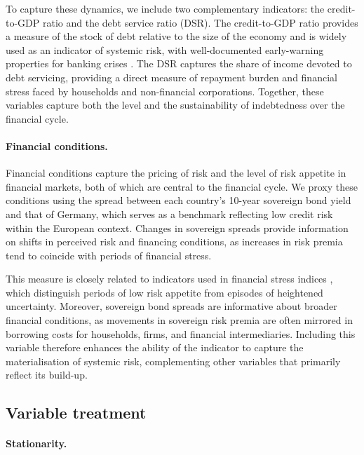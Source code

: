 To capture these dynamics, we include two complementary indicators: the credit-to-GDP ratio and the debt service ratio (DSR). The credit-to-GDP ratio provides a measure of the stock of debt relative to the size of the economy and is widely used as an indicator of systemic risk, with well-documented early-warning properties for banking crises \citep{aikman2015curbing}. The DSR captures the share of income devoted to debt servicing, providing a direct measure of repayment burden and financial stress faced by households and non-financial corporations. Together, these variables capture both the level and the sustainability of indebtedness over the financial cycle.

\paragraph{Financial conditions.}

Financial conditions capture the pricing of risk and the level of risk appetite in financial markets, both of which are central to the financial cycle. We proxy these conditions using the spread between each country’s 10-year sovereign bond yield and that of Germany, which serves as a benchmark reflecting low credit risk within the European context. Changes in sovereign spreads provide information on shifts in perceived risk and financing conditions, as increases in risk premia tend to coincide with periods of financial stress.

This measure is closely related to indicators used in financial stress indices \citep{hubrich2015financial}, which distinguish periods of low risk appetite from episodes of heightened uncertainty. Moreover, sovereign bond spreads are informative about broader financial conditions, as movements in sovereign risk premia are often mirrored in borrowing costs for households, firms, and financial intermediaries. Including this variable therefore enhances the ability of the indicator to capture the materialisation of systemic risk, complementing other variables that primarily reflect its build-up.

\subsection{Variable treatment}

\paragraph{Stationarity.} 

